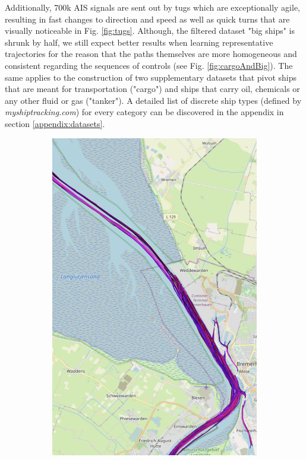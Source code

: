 Additionally, 700k AIS signals are sent out by tugs which are exceptionally agile, resulting in fast changes to direction and speed as well as quick turns that are visually noticeable in Fig. \ref{fig:tugs}. Although, the filtered dataset "big ships" is shrunk by half, we still expect better results when learning representative trajectories for the reason that the paths themselves are more homogeneous and consistent regarding the sequences of controls (see Fig. \ref{fig:cargoAndBig}). The same applies to the construction of two supplementary datasets that pivot ships that are meant for transportation ("cargo") and ships that carry oil, chemicals or any other fluid or gas ("tanker"). A detailed list of discrete ship types (defined by \textit{myshiptracking.com}) for every category can be discovered in the appendix in section \ref{appendix:datasets}.
\begin{figure}[H]
    \centering
    \begin{minipage}{.44\linewidth}
            \begin{subfigure}[t]{.9\linewidth}
                \includegraphics[width=\textwidth]{images/ais/tracks/tanker.png}

\end{subfigure}
\end{minipage}
\end{figure}
